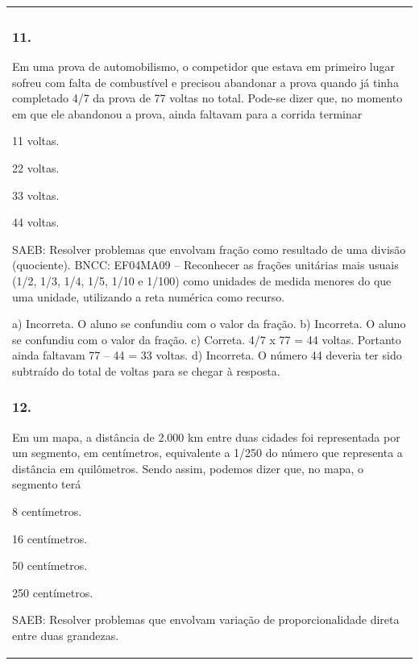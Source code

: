 \begin{mdframed}[linewidth=2pt,linecolor=salmao,roundcorner=2pt]
\begin{escolha}
{{{\begin{longtable}[]{@{}l@{}}
\begin{itemize}
{\begin{escolha}
\subsubsection{11.}

Em uma prova de automobilismo, o competidor que estava em primeiro lugar
sofreu com falta de combustível e precisou abandonar a prova quando já
tinha completado 4/7 da prova de 77 voltas no total. Pode-se dizer que,
no momento em que ele abandonou a prova, ainda faltavam para a corrida
terminar

\begin{escolha}
\item
  11 voltas.
\item
  22 voltas.
\item
  33 voltas.
\item
  44 voltas.
\end{escolha}

SAEB: Resolver problemas que envolvam fração como resultado
de uma divisão (quociente).
BNCC: EF04MA09 -- Reconhecer as frações unitárias mais usuais (1/2, 1/3, 1/4, 1/5, 1/10 e 1/100) como
unidades de medida menores do que uma unidade, utilizando a reta numérica como recurso.

a) Incorreta. O aluno se confundiu com o valor da fração.
b) Incorreta. O aluno se confundiu com o valor da fração.
c) Correta. 4/7 x 77 = 44 voltas. Portanto ainda faltavam 77 -- 44 = 33 voltas.
d) Incorreta. O número 44 deveria ter sido subtraído do total de voltas para se chegar à resposta.

\subsubsection{12.}

Em um mapa, a distância de 2.000 km entre duas cidades foi representada
por um segmento, em centímetros, equivalente a 1/250 do número que
representa a distância em quilômetros. Sendo assim, podemos dizer que, no
mapa, o segmento terá

\begin{escolha}
\item
  8 centímetros.
\item
  16 centímetros.
\item
  50 centímetros.
\item
  250 centímetros.
\end{escolha}

SAEB: Resolver problemas que envolvam variação de
proporcionalidade direta entre duas grandezas.


\end{escolha}}
\end{itemize}
\end{longtable}}}}
\end{escolha}
\end{mdframed}
